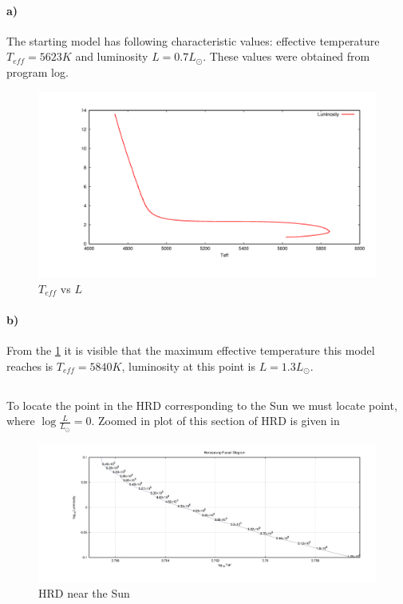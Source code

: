 \documentclass[12pt]{article}
\begin{document}
\paragraph{a)}
The starting model has following characteristic values: effective temperature $T_{eff}=5623K$ and luminosity $L=0.7L_{\odot}$. These values were obtained from program log.
\begin{figure}[ht]
\begin{center}
\includegraphics[width=1.0\textwidth]{T_vs_L}
\end{center}
\vspace*{-10mm}
\caption{$T_{eff}$ vs $L$}
\label{fig:Teff_vs_L}
\end{figure}
\paragraph{b)}

From the \ref{fig:Teff_vs_L} it is visible that the maximum effective temperature this model reaches is $T_{eff}=5840K$, luminosity at this point is $L=1.3L_{\odot}$.

\subsection{}
To locate the point in the HRD corresponding to the Sun we must locate point, where $\log \frac{L}{L_{\odot}} = 0$. Zoomed in plot of this section of HRD is given in 

\begin{figure}[ht]
\begin{center}
\includegraphics[width=1.0\textwidth]{ex_1_2.png}
\end{center}
\vspace*{-10mm}
\caption{HRD near the Sun}
\label{fig:HRD_sun}
\end{figure}
\end{document}
